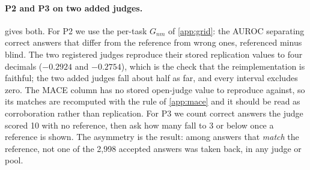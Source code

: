 \paragraph{P2 and P3 on two added judges.}
 gives both. For P2 we use the per-task $G_{nm}$ of \cref{app:grid}: the
AUROC separating correct answers that differ from the reference from wrong ones, referenced minus
blind. The two registered judges reproduce their stored replication values to four decimals
($-0.2924$ and $-0.2754$), which is the check that the reimplementation is faithful; the two added
judges fall about half as far, and every interval excludes zero. The \textsc{MACE} column has no
stored open-judge value to reproduce against, so its matches are recomputed with the rule of
\cref{app:mace} and it should be read as corroboration rather than replication. For P3 we count
correct answers the judge scored 10 with no reference, then ask how many fall to 3 or below once a
reference is shown. The asymmetry is the result: among answers that \emph{match} the reference,
not one of the 2{,}998 accepted answers was taken back, in any judge or pool.

